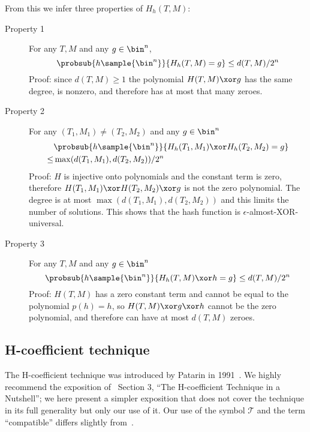 \documentclass[letterpaper,11pt]{article}
\begin{document}
From this we infer three properties of \(H_h(T, M)\):
\begin{description}
    \item[Property 1]
    For any \(T, M\) and any \(g \in \bin^n\),
    \begin{displaymath}
        \probsub{h\sample{\bin^n}}{H_h(T, M) = g} \leq d(T, M)/2^n
    \end{displaymath}
    Proof: since \(d(T, M) \geq 1\)
    the polynomial \(H(T, M) \xor g\) has the same degree,
    is nonzero,
    and therefore has at most that many zeroes.
    \item[Property 2] 
    For any \((T_1, M_1) \neq (T_2, M_2)\) and any \(g \in \bin^n\)
    \begin{align*}
        & \probsub{h\sample{\bin^n}}{H_h(T_1, M_1) \xor H_h(T_2, M_2) = g} \\
        \leq  & \max(d(T_1, M_1), d(T_2, M_2))/2^n
    \end{align*}
    Proof: \(H\) is injective onto polynomials
    and the constant term is zero, therefore
    \(H(T_1, M_1) \xor H(T_2, M_2) \xor g\)
    is not the zero polynomial.
    The degree is at most \(\max(d(T_1, M_1), d(T_2, M_2))\)
    and this limits the number of solutions.
    This shows that the hash function is
    \(\epsilon\)-almost-XOR-universal.
    \item[Property 3]
    For any \(T, M\) and any \(g \in \bin^n\)
    \begin{displaymath}
        \probsub{h\sample{\bin^n}}{H_h(T, M) \xor h = g} \leq d(T, M)/2^n
    \end{displaymath}
    Proof: \(H(T, M)\) has a zero constant term and
    cannot be equal to the polynomial \(p(h) = h\),
    so \(H(T, M) \xor g \xor h\) cannot be the zero polynomial, and
    therefore can have at most \(d(T, M)\) zeroes.
\end{description}

\subsection{H-coefficient technique}
The H-coefficient technique was introduced by Patarin in 1991~\cite{ppdes,hco}.
We highly recommend the exposition
of~\cite{hco2} Section 3,
``The H-coefficient Technique in a Nutshell'';
we here present a simpler exposition that
does not cover the technique in its full
generality but only our use of it.
Our use of the symbol \(\mathcal{T}\) and the term
``compatible'' differs slightly from~\cite{hco2}.
\end{document}

